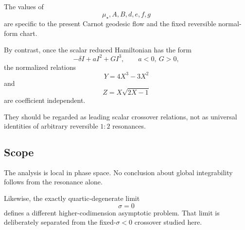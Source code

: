 The values of
\[
\mu_\star,A,B,d,e,f,g
\]
are specific to the present Carnot geodesic flow and the fixed reversible normal-form chart.

By contrast, once the scalar reduced Hamiltonian has the form
\[
-\delta I+aI^2+GI^3,
\qquad
a<0,\ G>0,
\]
the normalized relations
\[
Y=4X^3-3X^2
\]
and
\[
Z=X\sqrt{2X-1}
\]
are coefficient independent.

They should be regarded as leading scalar crossover relations, not as universal identities of arbitrary reversible \(1{:}2\) resonances.

\subsection{Scope}

The analysis is local in phase space. No conclusion about global integrability follows from the resonance alone.

Likewise, the exactly quartic-degenerate limit
\[
\sigma=0
\]
defines a different higher-codimension asymptotic problem. That limit is deliberately separated from the fixed-\(\sigma<0\) crossover studied here.
